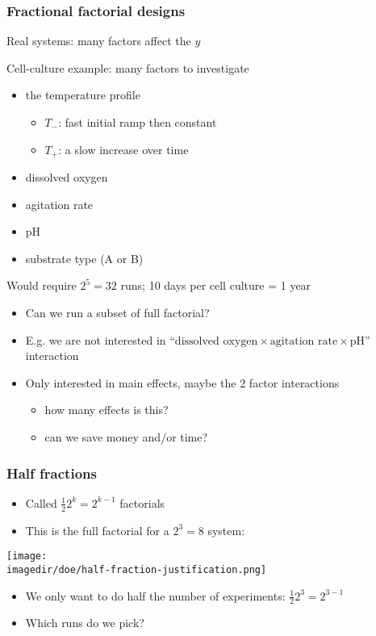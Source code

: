 \begin{frame}\frametitle{Fractional factorial designs}

	Real systems: many factors affect the $y$

	Cell-culture example: many factors to investigate
	\begin{itemize}
		\item	the temperature profile
		\begin{itemize}
			\item	$T_{-}$: fast initial ramp then constant
			\item	$T_{+}$: a slow increase over time
		\end{itemize}
		\item	dissolved oxygen
		\item	agitation rate
		\item	pH
		\item	substrate type (A or B)
	\end{itemize}

	Would require $2^5 = 32$ runs; 10 days per cell culture = 1 year
	\begin{itemize}
		\item	Can we run a subset of full factorial?
		\item	E.g. we are not interested in ``$\text{dissolved oxygen} \times \text{agitation rate} \times \text{pH}$'' interaction
		\item	Only interested in main effects, maybe the 2 factor interactions
		\begin{itemize}
			\item	how many effects is this?
			\item	can we save money and/or time?
		\end{itemize}
	\end{itemize}
\end{frame}

\begin{frame}\frametitle{Half fractions}
	\begin{itemize}
		\item	Called $\tfrac{1}{2}2^k = 2^{k-1}$ factorials
		\item	This is the full factorial for a $2^3 = 8$ system:
	\end{itemize}
	\begin{center}
		\texttt{[image: \\imagedir/doe/half-fraction-justification.png]}
	\end{center}
	\begin{itemize}
		\item	We only want to do half the number of experiments: $\tfrac{1}{2}2^3 = 2^{3-1}$
		\item	Which runs do we pick?
	\end{itemize}
\end{frame}

